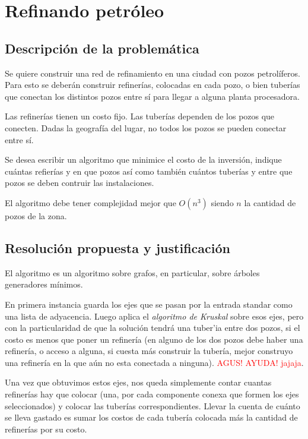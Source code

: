 \section{Refinando petr\'oleo}
\subsection{Descripci\'on de la problem\'atica}
	Se quiere construir una red de refinamiento en una ciudad con pozos petrol\'iferos. Para esto se deber\'an construir refiner\'ias, colocadas en cada pozo, o bien tuber\'ias que conectan los distintos pozos entre s\'i para llegar a alguna planta procesadora.

	Las refiner\'ias tienen un costo fijo. Las tuber\'ias dependen de los pozos que conecten. Dadas la geograf\'ia del lugar, no todos los pozos se pueden conectar entre s\'i.

	Se desea escribir un algoritmo que minimice el costo de la inversi\'on, indique cu\'antas refier\'ias y en que pozos as\'i como tambi\'en cu\'antos tuber\'ias y entre que pozos se deben contruir las instalaciones.

	El algoritmo debe tener complejidad mejor que $O(n^3)$ siendo $n$ la cantidad de pozos de la zona.

\subsection{Resoluci\'on propuesta y justificaci\'on}
	El algoritmo es un algoritmo sobre grafos, en particular, sobre \'arboles generadores m\'inimos.

	En primera instancia guarda los ejes que se pasan por la entrada standar como una lista de adyacencia. Luego aplica el \textit{algoritmo de Kruskal} sobre esos ejes, pero con la particularidad de que la soluci\'on tendr\'a una tuber'ia entre dos pozos, si el costo es menos que poner un refiner\'ia (en alguno de los dos pozos debe haber una refiner\'ia, o acceso a alguna, si cuesta m\'as construir la tuber\'ia, mejor construyo una refiner\'ia en la que a\'un no esta conectada a ninguna). \textcolor{red}{AGUS! AYUDA! jajaja}.

	Una vez que obtuvimos estos ejes, nos queda simplemente contar cuantas refiner\'ias hay que colocar (una, por cada componente conexa que formen los ejes seleccionados) y colocar las tuber\'ias correspondientes. Llevar la cuenta de cu\'anto se lleva gastado es sumar los costos de cada tuber\'ia colocada m\'as la cantidad de refiner\'ias por su costo.

